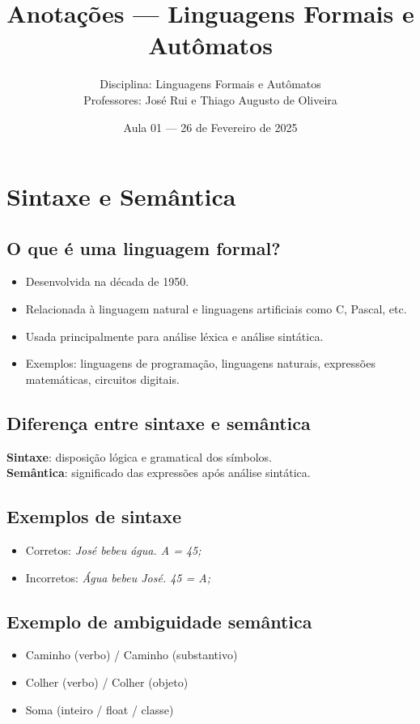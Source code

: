 \documentclass[12pt]{article}
\title{Anotações — Linguagens Formais e Autômatos}
\author{Disciplina: Linguagens Formais e Autômatos\\Professores: José Rui e Thiago Augusto de Oliveira}
\date{Aula 01 — 26 de Fevereiro de 2025}
\begin{document}
\maketitle

\section*{Sintaxe e Semântica}

\subsection*{O que é uma linguagem formal?}
\begin{itemize}
  \item Desenvolvida na década de 1950.
  \item Relacionada à linguagem natural e linguagens artificiais como C, Pascal, etc.
  \item Usada principalmente para análise léxica e análise sintática.
  \item Exemplos: linguagens de programação, linguagens naturais, expressões matemáticas, circuitos digitais.
\end{itemize}

\subsection*{Diferença entre sintaxe e semântica}
\textbf{Sintaxe}: disposição lógica e gramatical dos símbolos. \\
\textbf{Semântica}: significado das expressões após análise sintática.

\subsection*{Exemplos de sintaxe}
\begin{itemize}
  \item Corretos: \textit{José bebeu água. A = 45;}
  \item Incorretos: \textit{Água bebeu José. 45 = A;}
\end{itemize}

\subsection*{Exemplo de ambiguidade semântica}
\begin{itemize}
  \item Caminho (verbo) / Caminho (substantivo)
  \item Colher (verbo) / Colher (objeto)
  \item Soma (inteiro / float / classe)
\end{itemize}
\end{document}
